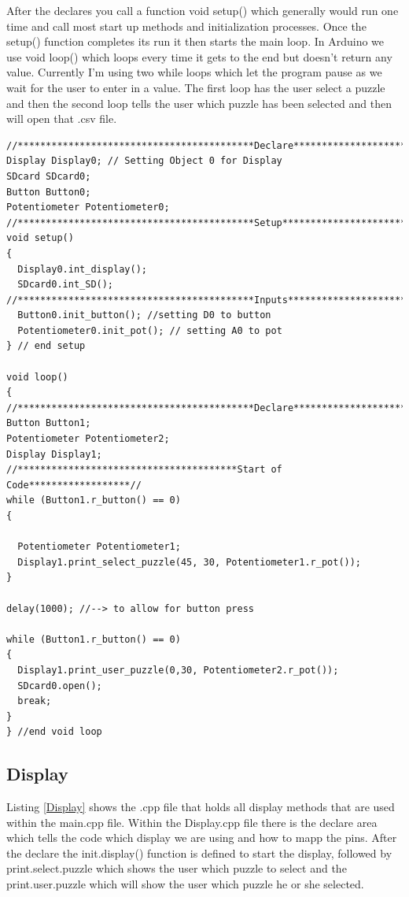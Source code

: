 \documentclass[11pt]{article}
\begin{document}
\noindent After the declares you call a function void setup() which generally would run one time and call most start up methods and initialization processes. Once the setup() function completes its run it then starts the main loop. In Arduino we use void loop() which loops every time it gets to the end but doesn't return any value. Currently I'm using two while loops which let the program pause as we wait for the user to enter in a value. The first loop has the user select a puzzle and then the second loop tells the user which puzzle has been selected and then will open that .csv file. 

\newpage 

\begin{lstlisting}[caption={Puzzle me Chess - main.cpp file},label={main}]
//******************************************Declare*********************//
Display Display0; // Setting Object 0 for Display
SDcard SDcard0; 
Button Button0;
Potentiometer Potentiometer0; 
//******************************************Setup***********************//
void setup()
{
  Display0.int_display();
  SDcard0.int_SD();
//******************************************Inputs**********************//
  Button0.init_button(); //setting D0 to button
  Potentiometer0.init_pot(); // setting A0 to pot
} // end setup

void loop()
{
//******************************************Declare*********************//
Button Button1;
Potentiometer Potentiometer2;
Display Display1;
//***************************************Start of Code******************//
while (Button1.r_button() == 0)
{
  
  Potentiometer Potentiometer1; 
  Display1.print_select_puzzle(45, 30, Potentiometer1.r_pot());
}

delay(1000); //--> to allow for button press

while (Button1.r_button() == 0)
{
  Display1.print_user_puzzle(0,30, Potentiometer2.r_pot());
  SDcard0.open();
  break;
}
} //end void loop
\end{lstlisting}

\subsection{Display}
Listing \ref{Display} shows the .cpp file that holds all display methods that are used within the main.cpp file. Within the Display.cpp file there is the declare area which tells the code which display we are using and how to mapp the pins. After the declare the init.display() function is defined to start the display, followed by print.select.puzzle which shows the user which puzzle to select and the print.user.puzzle which will show the user which puzzle he or she selected. 
\end{document}
